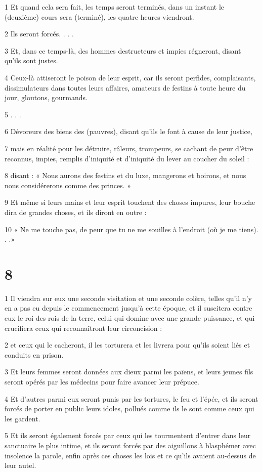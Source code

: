 \par 1 Et quand cela sera fait, les temps seront terminés, dans un instant le (deuxième) cours sera (terminé), les quatre heures viendront.
\par 2 Ils seront forcés. . . .
\par 3 Et, dans ce temps-là, des hommes destructeurs et impies régneront, disant qu'ils sont justes.
\par 4 Ceux-là attiseront le poison de leur esprit, car ils seront perfides, complaisants, dissimulateurs dans toutes leurs affaires, amateurs de festins à toute heure du jour, gloutons, gourmands.
\par 5 . . .
\par 6 Dévoreurs des biens des (pauvres), disant qu'ils le font à cause de leur justice,
\par 7 mais en réalité pour les détruire, râleurs, trompeurs, se cachant de peur d'être reconnus, impies, remplis d'iniquité et d'iniquité du lever au coucher du soleil :
\par 8 disant : « Nous aurons des festins et du luxe, mangerons et boirons, et nous nous considérerons comme des princes. »
\par 9 Et même si leurs mains et leur esprit touchent des choses impures, leur bouche dira de grandes choses, et ils diront en outre :
\par 10 « Ne me touche pas, de peur que tu ne me souilles à l'endroit (où je me tiens). . .»

\chapter{8}

\par 1 Il viendra sur eux une seconde visitation et une seconde colère, telles qu'il n'y en a pas eu depuis le commencement jusqu'à cette époque, et il suscitera contre eux le roi des rois de la terre, celui qui domine avec une grande puissance, et qui crucifiera ceux qui reconnaîtront leur circoncision :
\par 2 et ceux qui le cacheront, il les torturera et les livrera pour qu'ils soient liés et conduits en prison.
\par 3 Et leurs femmes seront données aux dieux parmi les païens, et leurs jeunes fils seront opérés par les médecins pour faire avancer leur prépuce.
\par 4 Et d'autres parmi eux seront punis par les tortures, le feu et l'épée, et ils seront forcés de porter en public leurs idoles, pollués comme ils le sont comme ceux qui les gardent.
\par 5 Et ils seront également forcés par ceux qui les tourmentent d'entrer dans leur sanctuaire le plus intime, et ils seront forcés par des aiguillons à blasphémer avec insolence la parole, enfin après ces choses les lois et ce qu'ils avaient au-dessus de leur autel.

